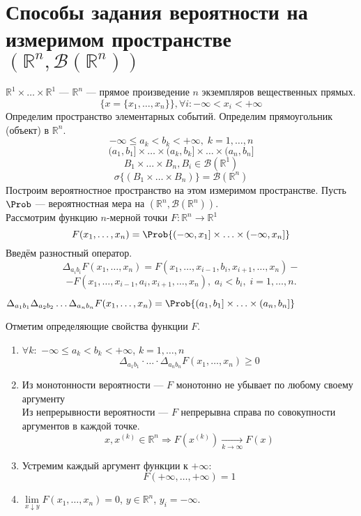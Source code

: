 \section{Способы задания вероятности на измеримом пространстве $(\mathbb{R}^n, \mathcal{B} (\mathbb{R}^n))$}
$\mathbb{R}^1 \times \ldots \times \mathbb{R}^1$ --- $\mathbb{R}^n$ --- прямое произведение $n$ экземпляров вещественных прямых.
\[
	\{ x = \{ x_1, \ldots, x_n \} \}, \forall i: -\infty < x_i < +\infty
\]
Определим пространство элементарных событий. Определим прямоугольник (объект) в $\mathbb{R}^n$.
\[
	-\infty \leqslant a_k < b_k < +\infty, \; k = 1, \ldots, n
\]
\[
	(a_1, b_1] \times \ldots \times (a_k, b_k] \times \ldots \times (a_n, b_n]
\]
\[
	B_1 \times \ldots \times B_n, B_i \in \mathcal{B} (\mathbb{R}^1)
\]
\[
	\sigma \{ (B_1 \times \ldots \times B_n) \} = \mathcal{B} (\mathbb{R}^n)
\]
Построим вероятностное пространство на этом измеримом пространстве. Пусть $\Prob$ --- вероятностная мера на $(\mathbb{R}^n, \mathcal{B}(\mathbb{R}^n))$. \\
Рассмотрим функцию $n$-мерной точки $F : \mathbb{R}^n \rightarrow \mathbb{R}^1$
\begin{equation}
	F (x_1, \ldots, x_n) = \Prob \{ (-\infty, x_1] \times \ldots \times (-\infty, x_n] \}
\end{equation}
Введём разностный оператор.
\[ \Delta_{a_i b_i} F(x_1, \ldots, x_n) = F(x_1, \ldots, x_{i-1}, b_i, x_{i+1}, \ldots, x_n) - \]
\[ - F(x_1, \ldots, x_{i-1}, a_i, x_{i+1}, \ldots, x_n), \; a_i < b_i, \; i = 1, \ldots, n. \]
\begin{example}
	$\Delta_{a_1 b_1} \Delta_{a_2 b_2} \ldots \Delta_{a_n b_n} F(x_1, \ldots, x_n) = \Prob \{(a_1, b_1] \times \ldots \times (a_n, b_n] \}$
\end{example}
Отметим определяющие свойства функции $F$.
\begin{enumerate}
	\item $\forall k :$ $-\infty \leqslant a_k < b_k < +\infty$, $k = 1, \ldots, n$
	\[
		\Delta_{a_1 b_1} \cdot \ldots \cdot \Delta_{a_n b_n} F(x_1, \ldots, x_n) \geqslant 0
	\]
	\item Из монотонности вероятности --- $F$ монотонно не убывает по любому своему аргументу \\
	Из непрерывности вероятности --- $F$ непрерывна справа по совокупности аргументов в каждой точке.
	\[
		x, x^{(k)} \in \mathbb{R}^n \Rightarrow F(x^{(k)}) \underset{k \to \infty}{\rightarrow}  F(x) 
	\]
	\item Устремим каждый аргумент функции к $+\infty$:
	\[
		F(+\infty, \ldots, +\infty) = 1
	\]
	\item $\lim\limits_{x \downarrow y} F (x_1, \ldots, x_n) = 0$, $y \in \mathbb{R}^n$, $y_i = -\infty$.
\end{enumerate}
